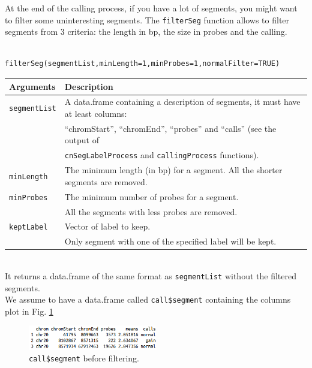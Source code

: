 \documentclass[a4paper,10pt]{article}
\begin{document}
			At the end of the calling process, if you have a lot of segments, you might want to filter some uninteresting segments. The \texttt{filterSeg} function allows to filter segments from 3 criteria: the  length in bp, the size in probes and the calling.
			
			\begin{verbatim}
				filterSeg(segmentList,minLength=1,minProbes=1,normalFilter=TRUE)
			\end{verbatim}
			
			\begin{tabular}{|l|l|}
				\hline
				Arguments & Description\\
				\hline
				\texttt{segmentList} & A data.frame containing a description of segments, it must have at least columns:\\
				~ & ``chromStart'', ``chromEnd'', ``probes'' and ``calls'' (see the output of\\
				~ & \texttt{cnSegLabelProcess} and \texttt{callingProcess} functions).\\
				\texttt{minLength} & The minimum length (in bp) for a segment. All the shorter segments are removed.\\
				\texttt{minProbes} & The minimum number of probes for a segment.\\
				~ & All the segments with less probes are removed.\\
				\texttt{keptLabel} & Vector of label to keep. \\
        ~ & Only segment with one of the specified label will be kept.\\
				\hline			
			\end{tabular}
			
			~~\\
			
			It returns a data.frame of the same format as \texttt{segmentList} without the filtered segments.\\
			
			We assume to have a data.frame called \texttt{call\$segment} containing the columns plot in Fig. \ref{callsegplot}
			\begin{figure}[!h]
				\centering
				\includegraphics[width=0.5\textwidth]{fig/callsoutput2}
				\caption{\texttt{call\$segment} before filtering.}
        \label{callsegplot}
			\end{figure}
			
\end{document}
